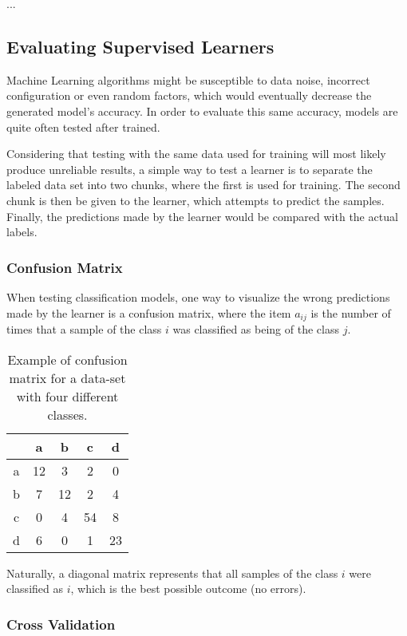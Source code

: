 ...

\subsection{Evaluating Supervised Learners}

Machine Learning algorithms might be susceptible to data noise, incorrect configuration or even random factors, which would eventually decrease the generated model's accuracy. In order to evaluate this same accuracy, models are quite often tested after trained.

Considering that testing with the same data used for training will most likely produce unreliable results, a simple way to test a learner is to separate the labeled data set into two chunks, where the first is used for training. The second chunk is then be given to the learner, which attempts to predict the samples. Finally, the predictions made by the learner would be compared with the actual labels.

\subsubsection{Confusion Matrix}

When testing classification models, one way to visualize the wrong predictions made by the learner is a confusion matrix, where the item $a_{ij}$ is the number of times that a sample of the class $i$ was classified as being of the class $j$.

\begin{table}[H]
	\centering
	\begin{tabular}{ |c || *{4}{c|} }
		\hline
           &   a &   b &   c &   d \\\hline\hline
		a & 12 &   3 &   2 &   0 \\
		b &   7 & 12 &   2 &   4 \\
		c &   0 &   4 & 54 &   8 \\
		d &   6 &   0 &   1 & 23 \\\hline
	\end{tabular}

	\caption{Example of confusion matrix for a data-set with four different classes.}
\end{table}

Naturally, a diagonal matrix represents that all samples of the class $i$ were classified as $i$, which is the best possible outcome (no errors).

\subsubsection{Cross Validation}

